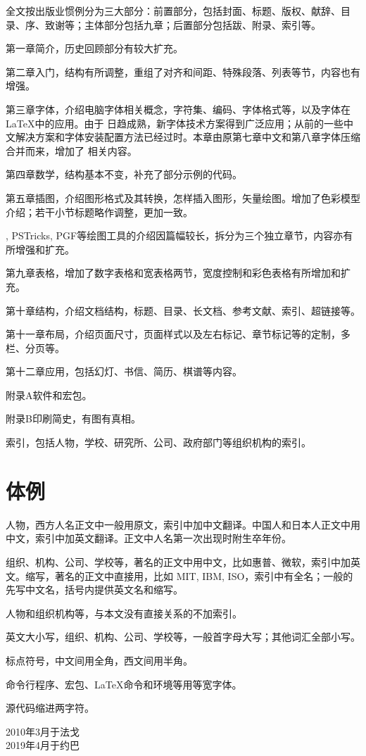 \begin{compactenum}
  \item 全文按出版业惯例分为三大部分：前置部分，包括封面、标题、版权、献辞、目录、序、致谢等；主体部分包括九章；后置部分包括跋、附录、索引等。
  \item 第一章简介，历史回顾部分有较大扩充。
  \item 第二章入门，结构有所调整，重组了对齐和间距、特殊段落、列表等节，内容也有增强。
  \item 第三章字体，介绍电脑字体相关概念，字符集、编码、字体格式等，以及字体在 \LaTeX 中的应用。由于 \XeTeX 日趋成熟，新字体技术方案得到广泛应用；从前的一些中文解决方案和字体安装配置方法已经过时。本章由原第七章中文和第八章字体压缩合并而来，增加了 \XeTeX 相关内容。
  \item 第四章数学，结构基本不变，补充了部分示例的代码。
  \item 第五章插图，介绍图形格式及其转换，怎样插入图形，矢量绘图。增加了色彩模型介绍；若干小节标题略作调整，更加一致。
  \item \MP, PSTricks, PGF等绘图工具的介绍因篇幅较长，拆分为三个独立章节，内容亦有所增强和扩充。
  \item 第九章表格，增加了数字表格和宽表格两节，宽度控制和彩色表格有所增加和扩充。
  \item 第十章结构，介绍文档结构，标题、目录、长文档、参考文献、索引、超链接等。
  \item 第十一章布局，介绍页面尺寸，页面样式以及左右标记、章节标记等的定制，多栏、分页等。
  \item 第十二章应用，包括幻灯、书信、简历、棋谱等内容。
  \item 附录A软件和宏包。
  \item 附录B印刷简史，有图有真相。
  \item 索引，包括人物，学校、研究所、公司、政府部门等组织机构的索引。
\end{compactenum}

\section*{体例}

\begin{compactenum}
  \item 人物，西方人名正文中一般用原文，索引中加中文翻译。中国人和日本人正文中用中文，索引中加英文翻译。正文中人名第一次出现时附生卒年份。
  \item 组织、机构、公司、学校等，著名的正文中用中文，比如惠普、微软，索引中加英文。缩写，著名的正文中直接用，比如 MIT, IBM, ISO，索引中有全名；一般的先写中文名，括号内提供英文名和缩写。
  \item 人物和组织机构等，与本文没有直接关系的不加索引。
  \item 英文大小写，组织、机构、公司、学校等，一般首字母大写；其他词汇全部小写。
  \item 标点符号，中文间用全角，西文间用半角。
  \item 命令行程序、宏包、\LaTeX 命令和环境等用等宽字体。
  \item 源代码缩进两字符。
\end{compactenum}

\begin{flushright}
  2010年3月于法戈\\
  2019年4月于约巴
\end{flushright}
